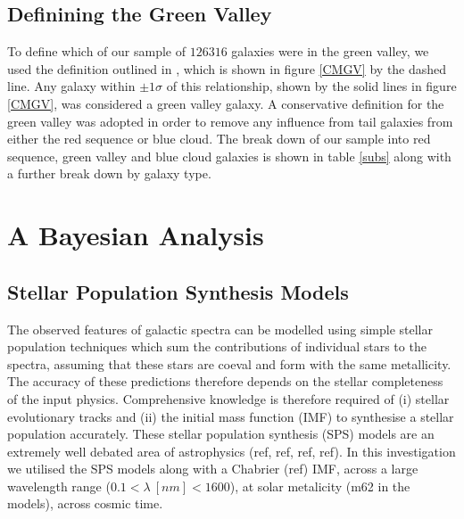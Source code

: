 \documentclass{mn2e}
\begin{document}
\subsection{Definining the Green Valley}\label{defGV}


To define which of our sample of $126316$ galaxies were in the green valley, we used the definition outlined in \citet{Baldry}, which is shown in figure \ref{CMGV} by the dashed line. Any galaxy within $\pm 1\sigma$ of this relationship, shown by the solid lines in figure \ref{CMGV}, was considered a green valley galaxy. A conservative definition for the green valley was adopted in order to remove any influence from tail galaxies from either the red sequence or blue cloud. The break down of our sample into red sequence, green valley and blue cloud galaxies is shown in table \ref{subs} along with a further break down by galaxy type. 


\section{A Bayesian Analysis}\label{models}
\subsection{Stellar Population Synthesis Models}\label{SPS}
The observed features of galactic spectra can be modelled using simple stellar population techniques which sum the contributions of individual stars to the spectra, assuming that these stars are coeval and form with the same metallicity. The accuracy of these predictions therefore depends on the stellar completeness of the input physics. Comprehensive knowledge is therefore required of (i) stellar evolutionary tracks and (ii) the initial mass function (IMF) to synthesise a stellar population accurately. These stellar population synthesis (SPS) models are an extremely well debated area of astrophysics (ref, ref, ref, ref). In this investigation we utilised the \citet{BC03} SPS models along with a Chabrier (ref) IMF, across a large wavelength range ($0.1 < \lambda ~[nm] < 1600$), at solar metalicity (m62 in the \citet{BC03} models), across cosmic time. 
\end{document}
